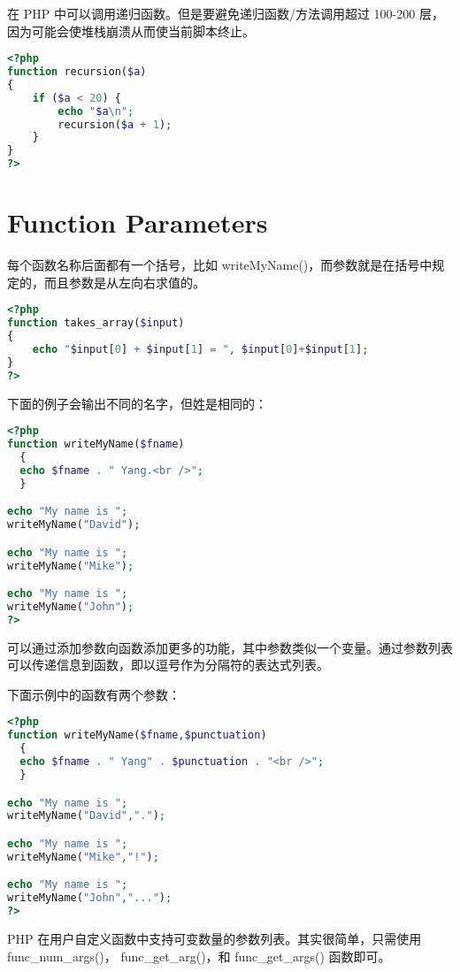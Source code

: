 在 PHP 中可以调用递归函数。但是要避免递归函数/方法调用超过 100-200 层，因为可能会使堆栈崩溃从而使当前脚本终止。

\begin{lstlisting}[language=PHP]
<?php
function recursion($a)
{
    if ($a < 20) {
        echo "$a\n";
        recursion($a + 1);
    }
}
?>
\end{lstlisting}





\section{Function Parameters}

每个函数名称后面都有一个括号，比如 writeMyName()，而参数就是在括号中规定的，而且参数是从左向右求值的。

\begin{lstlisting}[language=PHP]
<?php
function takes_array($input)
{
    echo "$input[0] + $input[1] = ", $input[0]+$input[1];
}
?>
\end{lstlisting}

下面的例子会输出不同的名字，但姓是相同的：


\begin{lstlisting}[language=PHP]
<?php
function writeMyName($fname)
  {
  echo $fname . " Yang.<br />";
  }

echo "My name is ";
writeMyName("David");

echo "My name is ";
writeMyName("Mike");

echo "My name is ";
writeMyName("John");
?>
\end{lstlisting}

可以通过添加参数向函数添加更多的功能，其中参数类似一个变量。通过参数列表可以传递信息到函数，即以逗号作为分隔符的表达式列表。


下面示例中的函数有两个参数：

\begin{lstlisting}[language=PHP]
<?php
function writeMyName($fname,$punctuation)
  {
  echo $fname . " Yang" . $punctuation . "<br />";
  }

echo "My name is ";
writeMyName("David",".");

echo "My name is ";
writeMyName("Mike","!");

echo "My name is ";
writeMyName("John","...");
?>
\end{lstlisting}



PHP 在用户自定义函数中支持可变数量的参数列表。其实很简单，只需使用 func\_num\_args()， func\_get\_arg()，和 func\_get\_args() 函数即可。

